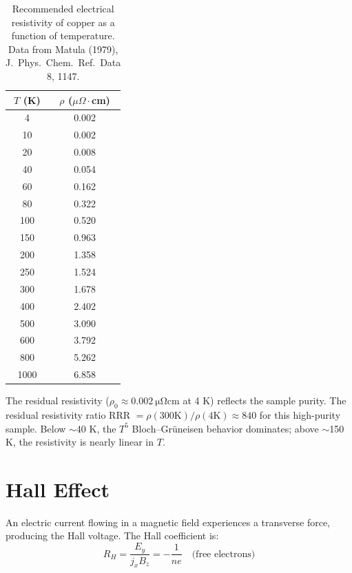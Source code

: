 \begin{table}[H]
\centering
\caption{Recommended electrical resistivity of copper as a function of temperature. Data from Matula (1979), J.\ Phys.\ Chem.\ Ref.\ Data 8, 1147.}
\label{tab:cu_resistivity}
\begin{tabular}{@{}SS@{}}
\toprule
{$T$ (K)} & {$\rho$ ($\mu\Omega\cdot$cm)} \\
   & 0.002 \\
 10   & 0.002 \\
 20   & 0.008 \\
 40   & 0.054 \\
 60   & 0.162 \\
 80   & 0.322 \\
100   & 0.520 \\
150   & 0.963 \\
200   & 1.358 \\
250   & 1.524 \\
300   & 1.678 \\
400   & 2.402 \\
500   & 3.090 \\
600   & 3.792 \\
800   & 5.262 \\
1000  & 6.858 \\
\bottomrule
\end{tabular}
\end{table}

The residual resistivity ($\rho_0 \approx \SI{0.002}{\micro\ohm\centi\metre}$ at 4 K) reflects the sample purity. The residual resistivity ratio RRR $= \rho(300\text{K})/\rho(4\text{K}) \approx 840$ for this high-purity sample. Below $\sim$40 K, the $T^5$ Bloch--Gr\"uneisen behavior dominates; above $\sim$150 K, the resistivity is nearly linear in $T$.


\section{Hall Effect}

An electric current flowing in a magnetic field experiences a transverse force, producing the Hall voltage. The Hall coefficient is:
\begin{equation}
  R_H = \frac{E_y}{j_x B_z} = -\frac{1}{ne} \quad \text{(free electrons)}
\end{equation}

